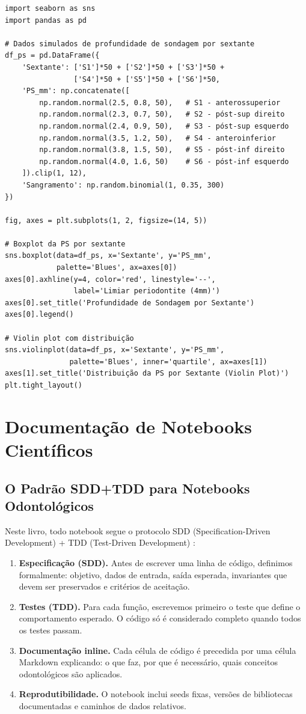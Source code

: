 \begin{verbatim}
import seaborn as sns
import pandas as pd

# Dados simulados de profundidade de sondagem por sextante
df_ps = pd.DataFrame({
    'Sextante': ['S1']*50 + ['S2']*50 + ['S3']*50 +
                ['S4']*50 + ['S5']*50 + ['S6']*50,
    'PS_mm': np.concatenate([
        np.random.normal(2.5, 0.8, 50),   # S1 - anterossuperior
        np.random.normal(2.3, 0.7, 50),   # S2 - póst-sup direito
        np.random.normal(2.4, 0.9, 50),   # S3 - póst-sup esquerdo
        np.random.normal(3.5, 1.2, 50),   # S4 - anteroinferior
        np.random.normal(3.8, 1.5, 50),   # S5 - póst-inf direito
        np.random.normal(4.0, 1.6, 50)    # S6 - póst-inf esquerdo
    ]).clip(1, 12),
    'Sangramento': np.random.binomial(1, 0.35, 300)
})

fig, axes = plt.subplots(1, 2, figsize=(14, 5))

# Boxplot da PS por sextante
sns.boxplot(data=df_ps, x='Sextante', y='PS_mm',
            palette='Blues', ax=axes[0])
axes[0].axhline(y=4, color='red', linestyle='--',
                label='Limiar periodontite (4mm)')
axes[0].set_title('Profundidade de Sondagem por Sextante')
axes[0].legend()

# Violin plot com distribuição
sns.violinplot(data=df_ps, x='Sextante', y='PS_mm',
               palette='Blues', inner='quartile', ax=axes[1])
axes[1].set_title('Distribuição da PS por Sextante (Violin Plot)')
plt.tight_layout()
\end{verbatim}

\section{Documentação de Notebooks Científicos}

\subsection{O Padrão SDD+TDD para Notebooks Odontológicos}

Neste livro, todo notebook segue o protocolo SDD (Specification-Driven Development) + TDD (Test-Driven Development) :

\begin{enumerate}
    \item \textbf{Especificação (SDD).} Antes de escrever uma linha de código, definimos formalmente: objetivo, dados de entrada, saída esperada, invariantes que devem ser preservados e critérios de aceitação.
    \item \textbf{Testes (TDD).} Para cada função, escrevemos primeiro o teste que define o comportamento esperado. O código só é considerado completo quando todos os testes passam.
    \item \textbf{Documentação inline.} Cada célula de código é precedida por uma célula Markdown explicando: o que faz, por que é necessário, quais conceitos odontológicos são aplicados.
    \item \textbf{Reprodutibilidade.} O notebook inclui seeds fixas, versões de bibliotecas documentadas e caminhos de dados relativos.
\end{enumerate}

